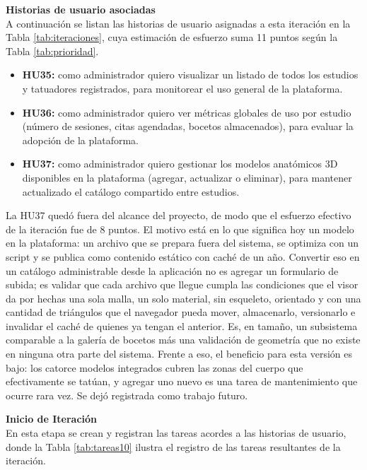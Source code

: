 \documentclass[12pt,letterpaper,oneside]{report}
\newcommand{\tituloparpegado}[1]{\par\textbf{#1}\\\indent\ignorespaces}
\begin{document}
\vspace{0.3cm}
\tituloparpegado{Historias de usuario asociadas}
A continuación se listan las historias de usuario asignadas a esta iteración en la Tabla \ref{tab:iteraciones}, cuya estimación de esfuerzo suma 11 puntos según la Tabla \ref{tab:prioridad}.

\begin{itemize}
  \item \textbf{HU35:} como administrador quiero visualizar un listado de todos los estudios y tatuadores registrados, para monitorear el uso general de la plataforma.
  \item \textbf{HU36:} como administrador quiero ver métricas globales de uso por estudio (número de sesiones, citas agendadas, bocetos almacenados), para evaluar la adopción de la plataforma.
  \item \textbf{HU37:} como administrador quiero gestionar los modelos anatómicos 3D disponibles en la plataforma (agregar, actualizar o eliminar), para mantener actualizado el catálogo compartido entre estudios.
\end{itemize}

La HU37 quedó fuera del alcance del proyecto, de modo que el esfuerzo efectivo de la iteración fue de 8 puntos. El motivo está en lo que significa hoy un modelo en la plataforma: un archivo que se prepara fuera del sistema, se optimiza con un script y se publica como contenido estático con caché de un año. Convertir eso en un catálogo administrable desde la aplicación no es agregar un formulario de subida; es validar que cada archivo que llegue cumpla las condiciones que el visor da por hechas una sola malla, un solo material, sin esqueleto, orientado y con una cantidad de triángulos que el navegador pueda mover, almacenarlo, versionarlo e invalidar el caché de quienes ya tengan el anterior. Es, en tamaño, un subsistema comparable a la galería de bocetos más una validación de geometría que no existe en ninguna otra parte del sistema. Frente a eso, el beneficio para esta versión es bajo: los catorce modelos integrados cubren las zonas del cuerpo que efectivamente se tatúan, y agregar uno nuevo es una tarea de mantenimiento que ocurre rara vez. Se dejó registrada como trabajo futuro.

\vspace{0.3cm}
\tituloparpegado{Inicio de Iteración}
En esta etapa se crean y registran las tareas acordes a las historias de usuario, donde la Tabla \ref{tab:tareas10} ilustra el registro de las tareas resultantes de la iteración.
\end{document}
